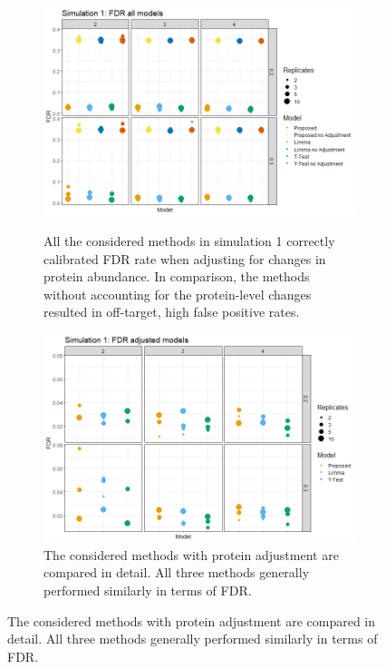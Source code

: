 \documentclass{mcp}
\begin{document}
\begin{figure}[h!]
\centering
 \begin{subfigure}{.9\textwidth}
	\includegraphics[width=.9\textwidth]{sim_new/sim1_FDR_all_models}\\
	\caption{All the considered methods in simulation 1 correctly calibrated FDR rate when adjusting for changes in protein abundance. In comparison, the methods without accounting for the protein-level changes resulted in off-target, high false positive rates.}
 \end{subfigure}
 \begin{subfigure}{.9\textwidth}
	\includegraphics[width=.9\textwidth]{sim_new/sim1_FDR}
	\caption{The considered methods with protein adjustment are compared in detail. All three methods generally performed similarly in terms of FDR.}
 \end{subfigure}
\label{fig:sim1_fpr}
\end{figure}
\end{document}
